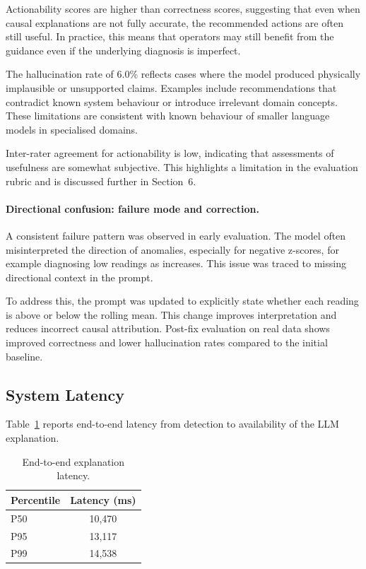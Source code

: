 \documentclass[11pt, a4paper]{article}
\begin{document}
Actionability scores are higher than correctness scores, suggesting that
even when causal explanations are not fully accurate, the recommended
actions are often still useful. In practice, this means that operators
may still benefit from the guidance even if the underlying diagnosis is
imperfect.

The hallucination rate of 6.0\% reflects cases where the model produced
physically implausible or unsupported claims. Examples include
recommendations that contradict known system behaviour or introduce
irrelevant domain concepts. These limitations are consistent with known
behaviour of smaller language models in specialised domains.

Inter-rater agreement for actionability is low, indicating that
assessments of usefulness are somewhat subjective. This highlights a
limitation in the evaluation rubric and is discussed further in
Section~6.

\paragraph{Directional confusion: failure mode and correction.}

A consistent failure pattern was observed in early evaluation. The model
often misinterpreted the direction of anomalies, especially for negative
z-scores, for example diagnosing low readings as increases. This issue
was traced to missing directional context in the prompt.

To address this, the prompt was updated to explicitly state whether each
reading is above or below the rolling mean. This change improves
interpretation and reduces incorrect causal attribution. Post-fix
evaluation on real data shows improved correctness and lower
hallucination rates compared to the initial baseline.

\subsection{System Latency}

Table~\ref{tab:latency} reports end-to-end latency from detection to
availability of the LLM explanation.

\begin{table}[h]
\centering
\caption{End-to-end explanation latency.}
\label{tab:latency}
\begin{tabular}{lc}
\toprule
\textbf{Percentile} & \textbf{Latency (ms)} \\
\midrule
P50 & 10,470 \\
P95 & 13,117 \\
P99 & 14,538 \\
\bottomrule
\end{tabular}
\end{table}
\end{document}
